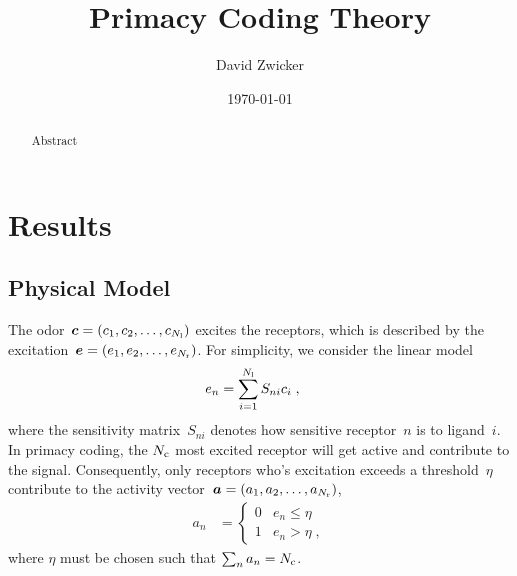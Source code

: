 \documentclass[twocolumn, superscriptaddress]{revtex4}
\newcommand{\Nc}{{N_{\rm c}}}
\newcommand{\Nl}{{N_{\rm l}}}
\newcommand{\Nr}{{N_{\rm r}}}
\begin{document}
\title{Primacy Coding Theory}
\date{\today}

\author{David Zwicker}


\begin{abstract}
Abstract\end{abstract}


\maketitle

\newlength{\figwidth}
\setlength{\figwidth}{86mm}
\setlength{\figwidth}{\columnwidth}

 \section{Results}
 \subsection{Physical Model}
 The odor~$\vect c = (c_1, c_2, \ldots, c_{\Nl})$ excites the receptors, which is described by the excitation~$\vect e = (e_1, e_2, \ldots, e_{\Nr})$.
 For simplicity, we consider the linear model
 \begin{align}
	e_n &= \sum_{i=1}^{\Nl} S_{ni} c_i
	\;,
\end{align}
where the sensitivity matrix~$S_{ni}$ denotes how sensitive receptor~$n$ is to ligand~$i$.
In primacy coding, the $\Nc$ most excited receptor will get active and contribute to the signal.
Consequently, only receptors who's excitation exceeds a threshold~$\eta$ contribute to the activity vector~$\vect a = (a_1, a_2, \ldots, a_{\Nr})$,
\begin{align}
	a_n &= \begin{cases}
		0 & e_n \le \eta \\
		1 & e_n > \eta \;,
	\end{cases}
\end{align}
where $\eta$ must be chosen such that $\sum_n a_n = \Nc$.
\end{document}
